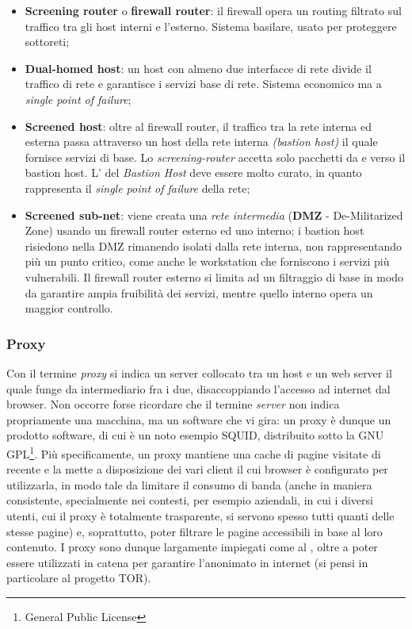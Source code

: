 \documentclass[a4paper,11pt]{article}
\def\subsub#1{\subsubsection{#1}\label{#1}}
\def\vedi#1{\nameref{#1}}
\begin{document}
\begin{itemize}
\item \textbf{Screening router} o \textbf{firewall router}: il firewall opera un routing filtrato sul traffico tra gli host interni e l'esterno. Sistema basilare, usato per proteggere sottoreti;
\item \textbf{Dual-homed host}: un host con almeno due interfacce di rete divide il traffico di rete e garantisce i servizi base di rete. Sistema economico ma a \textit{single point of failure};
\item \textbf{Screened host}: oltre al firewall router, il traffico tra la rete interna ed esterna passa attraverso un host della rete interna \textit{(bastion host)} il quale fornisce servizi di base. Lo \textit{screening-router} accetta solo pacchetti da e verso il bastion host. L'\vedi{Hardening} del \textit{Bastion Host} deve essere molto curato, in quanto rappresenta il \textit{single point of failure} della rete;
\item \textbf{Screened sub-net}: viene creata una \textit{rete intermedia} (\textbf{DMZ} - De-Militarized Zone) usando un firewall router esterno ed uno interno; i bastion host risiedono nella DMZ rimanendo isolati dalla rete interna, non rappresentando più un punto critico, come anche le workstation che forniscono i servizi più vulnerabili. Il firewall router esterno si limita ad un filtraggio di base in modo da garantire ampia fruibilità dei servizi, mentre quello interno opera un maggior controllo.
\end{itemize}
\subsub{Proxy}
Con il termine \textit{proxy} si indica un server collocato tra un host e un web server il quale funge da intermediario fra i due, disaccoppiando l'accesso ad internet dal browser. Non occorre forse ricordare che il termine \textit{server} non indica propriamente una macchina, ma un software che vi gira: un proxy è dunque un prodotto software, di cui è un noto esempio SQUID, distribuito sotto la GNU GPL\footnote{General Public License}. Più specificamente, un proxy mantiene una cache di pagine visitate di recente e la mette a disposizione dei vari client il cui browser è configurato per utilizzarla, in modo tale da limitare il consumo di banda (anche in maniera consistente, specialmente nei contesti, per esempio aziendali, in cui i diversi utenti, cui il proxy è totalmente trasparente, si servono spesso tutti quanti delle stesse pagine) e, soprattutto, poter filtrare le pagine accessibili in base al loro contenuto. I proxy sono dunque largamente impiegati come \vedi{Firewall} al \vedi{Livello delle applicazioni}, oltre a poter essere utilizzati in catena per garantire l'anonimato in internet (si pensi in particolare al progetto TOR).
\end{document}
